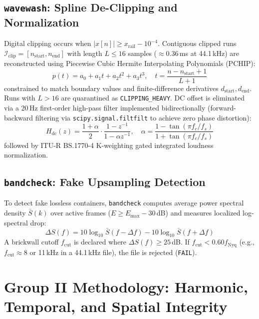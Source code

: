 \documentclass[10pt,journal,compsoc]{IEEEtran}
\begin{document}
\subsection{\texttt{wavewash}: Spline De-Clipping and Normalization}
Digital clipping occurs when $|x[n]| \ge x_{\text{rail}} - 10^{-4}$. Contiguous clipped runs $\mathcal{I}_{\text{clip}} = [n_{\text{start}}, n_{\text{end}}]$ with length $L \le 16$ samples ($\approx 0.36$\,ms at 44.1\,kHz) are reconstructed using Piecewise Cubic Hermite Interpolating Polynomials (PCHIP):
\begin{equation}
p(t) = a_0 + a_1 t + a_2 t^2 + a_3 t^3, \quad t = \frac{n - n_{\text{start}} + 1}{L + 1}
\end{equation}
constrained to match boundary values and finite-difference derivatives $d_{\text{start}}, d_{\text{end}}$. Runs with $L > 16$ are quarantined as \texttt{CLIPPING\_HEAVY}. DC offset is eliminated via a 20\,Hz first-order high-pass filter implemented bidirectionally (forward-backward filtering via \texttt{scipy.signal.filtfilt} to achieve zero phase distortion):
\begin{equation}
H_{\text{dc}}(z) = \frac{1 + \alpha}{2} \cdot \frac{1 - z^{-1}}{1 - \alpha z^{-1}}, \quad \alpha = \frac{1 - \tan(\pi f_c / f_s)}{1 + \tan(\pi f_c / f_s)}
\end{equation}
followed by ITU-R BS.1770-4 K-weighting gated integrated loudness normalization.

\subsection{\texttt{bandcheck}: Fake Upsampling Detection}
To detect fake lossless containers, \texttt{bandcheck} computes average power spectral density $\bar{S}(k)$ over active frames ($E \ge E_{\max} - 30$\,dB) and measures localized log-spectral drop:
\begin{equation}
\Delta S(f) = 10 \log_{10} \bar{S}(f - \Delta f) - 10 \log_{10} \bar{S}(f + \Delta f)
\end{equation}
A brickwall cutoff $f_{\text{cut}}$ is declared where $\Delta S(f) \ge 25$\,dB. If $f_{\text{cut}} < 0.60 f_{\text{Nyq}}$ (e.g., $f_{\text{cut}} \approx 8$ or 11\,kHz in a 44.1\,kHz file), the file is rejected (\texttt{FAIL}).

\section{Group II Methodology: Harmonic, Temporal, and Spatial Integrity}
\end{document}
